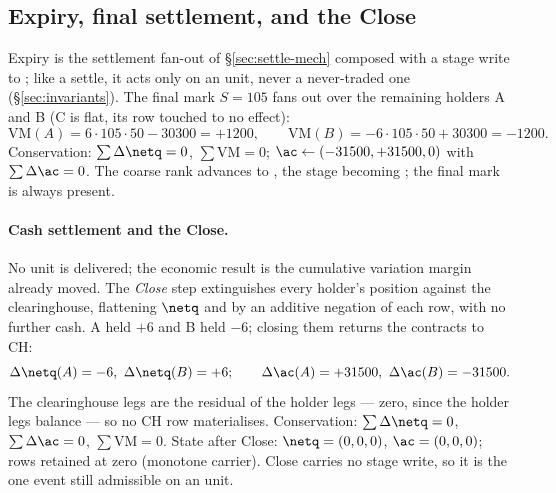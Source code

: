 \documentclass[11pt,a4paper]{article}
\begin{document}
\subsection{Expiry, final settlement, and the Close}

Expiry is the settlement fan-out of \S\ref{sec:settle-mech} composed with a stage write to
; like a settle, it acts only on an  unit, never a never-traded one
(\S\ref{sec:invariants}). The final mark $S=105$ fans out over the remaining holders A and B (C is
flat, its row touched to no effect):
\[
\mathrm{VM}(A) = 6\cdot 105\cdot 50 - 30300 = +1200,\qquad
\mathrm{VM}(B) = -6\cdot 105\cdot 50 + 30300 = -1200.
\]
Conservation: $\sum\Delta\netq=0$, $\sum\mathrm{VM}=0$; $\ac\leftarrow(-31500,+31500,0)$ with
$\sum\Delta\ac=0$. The coarse rank advances to , the stage becoming
; the final mark is always present.

\paragraph{Cash settlement and the Close.} No unit is delivered; the economic result is the
cumulative variation margin already moved. The \emph{Close} step extinguishes every holder's position
against the clearinghouse, flattening $\netq$ and \ac{} by an additive negation of each row, with no
further cash. A held $+6$ and B held $-6$; closing them returns the contracts to CH:
\[
\Delta\netq(A)=-6,\ \Delta\netq(B)=+6;\qquad \Delta\ac(A)=+31500,\ \Delta\ac(B)=-31500.
\]
The clearinghouse legs are the residual of the holder legs --- zero, since the holder legs balance ---
so no CH row materialises. Conservation: $\sum\Delta\netq=0$, $\sum\Delta\ac=0$, $\sum\mathrm{VM}=0$.
State after Close: $\netq=(0,0,0)$, $\ac=(0,0,0)$; rows retained at zero (monotone carrier). Close
carries no stage write, so it is the one event still admissible on an  unit.
\end{document}

